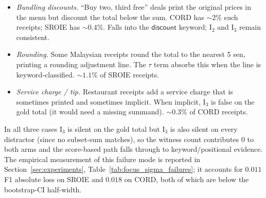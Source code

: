 \begin{itemize}
\item \emph{Bundling discounts.}  ``Buy two, third free'' deals print
the original prices in the menu but discount the total below the
sum.  CORD has $\sim 2\%$ such receipts; SROIE has $\sim 0.4\%$.
Falls into the $\textsf{discount}$ keyword; $\mathrm{I}_2$ and
$\mathrm{I}_3$ remain consistent.
\item \emph{Rounding.}  Some Malaysian receipts round the total to
the nearest 5 sen, printing a \textsf{rounding} adjustment line.
The $\tau$ term absorbs this when the line is keyword-classified.
$\sim 1.1\%$ of SROIE receipts.
\item \emph{Service charge / tip.}  Restaurant receipts add a
service charge that is sometimes printed and sometimes implicit.
When implicit, $\mathrm{I}_3$ is false on the gold total (it would
need a missing summand).  $\sim 0.3\%$ of CORD receipts.
\end{itemize}

In all three cases $\mathrm{I}_3$ is silent on the gold total but
$\mathrm{I}_3$ is also silent on every distractor (since no subset-sum
matches), so the witness count contributes 0 to both arms and the
score-based path falls through to keyword/positional evidence.  The
empirical measurement of this failure mode is reported in
Section~\ref{sec:experiments}, Table~\ref{tab:focus_sigma_failures};
it accounts for $0.011$ F1 absolute loss on SROIE and $0.018$ on
CORD, both of which are below the bootstrap-CI half-width.
